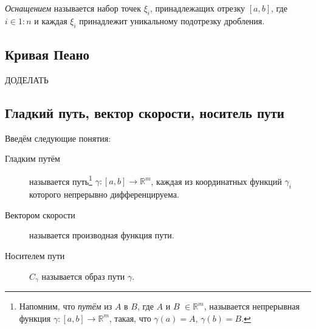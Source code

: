\begin{definition}
	\textit{Оснащением} называется набор точек \(\xi_i\), принадлежащих отрезку \([a, b]\), где \(i \in 1 : n\) и каждая \(\xi_i\) принадлежит уникальному подотрезку дробления.
\end{definition}

\subsection{Кривая Пеано}

\begin{example}
	ДОДЕЛАТЬ
\end{example}

\subsection{Гладкий путь, вектор скорости, носитель пути}

\begin{definition}
	Введём следующие понятия:
	\begin{description}
		\item[Гладким путём] называется путь\footnote{Напомним, что \textit{путём} из \(A\) в \(B\), где \(A\) и \(B\) \(\in \mathbb{R}^m\), называется непрерывная функция \(\gamma \colon [a, b] \to \mathbb{R}^m\), такая, что \(\gamma(a) = A\), \(\gamma(b) = B\).} \(\gamma \colon [a, b] \to \mathbb{R}^m\), каждая из координатных функций \(\gamma_i\) которого непрерывно дифференцируема.
		\item[Вектором скорости] называется производная функция пути.
		\item[Носителем пути] \(C_\gamma\) называется образ пути \(\gamma\).
	\end{description}
\end{definition}